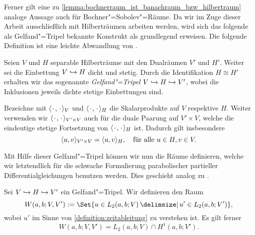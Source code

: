 \documentclass[../main.tex]{subfiles}
\begin{document}
Ferner gilt eine zu \cref{lemma:bochnerraum_ist_banachraum_bzw_hilbertraum} analoge Aussage auch für Bochner"=Sobolev"=Räume.
Da wir im Zuge dieser Arbeit ausschließlich mit Hilberträumen arbeiten werden, wird sich das folgende als Gelfand"=Tripel bekannte Konstrukt als grundlegend erweisen.
Die folgende Definition ist eine leichte Abwandlung von \cite[Abschnitt 10.2]{Schweizer2013}.

\begin{Definition}
\label{definition:gelfand_tripel}
    Seien $V$ und $H$ separable Hilberträume mit den Dualräumen $V'$ und $H'$.
    Weiter sei die Einbettung $V \denseinclusion H$ dicht und stetig.
    Durch die Identifikation $H \cong H'$ erhalten wir das sogenannte \emph{Gelfand"=Tripel} $V \denseinclusion H \denseinclusion V'$, wobei die Inklusionen jeweils dichte stetige Einbettungen sind.
\end{Definition}

\begin{Bemerkung}
\label{bemerkung:skalarprodukte_und_duality_pairing}
    Bezeichne mit $\skp{\blank}{\blank}{V}$ und $\skp{\blank}{\blank}{H}$ die Skalarprodukte auf $V$ respektive $H$.
    Weiter verwenden wir $\skp{\blank}{\blank}{V' \times V}$ auch für die duale Paarung auf $V' \times V$, welche die eindeutige stetige Fortsetzung von $\skp{\blank}{\blank}{H}$ ist.
    Dadurch gilt insbesondere
    \begin{equation}
        \skp{u}{v}{V' \times V} = \skp{u}{v}{H}, \quad \fa u \in H, v \in V.
    \end{equation}
\end{Bemerkung}

Mit Hilfe dieser Gelfand"=Tripel können wir nun die Räume definieren, welche wir letztendlich für die schwache Formulierung parabolischer partieller Differentialgleichungen benutzen werden.
Dies geschieht analog zu \cite[Definition XVIII.2.4]{Dautray:1992by}.

\begin{Definition}
\label{definition:bochner_raum_W}
    Sei $V \denseinclusion H \denseinclusion V'$ ein Gelfand"=Tripel.
    Wir definieren den Raum
    \begin{equation}
        W(a, b; V, V') := \Set{u \in L_{2}(a, b; V) \given u' \in L_{2}(a, b; V')},
    \end{equation}
    wobei $u'$ im Sinne von \cref{definition:zeitableitung} zu verstehen ist.
    Es gilt ferner
    \begin{equation}
        W(a, b; V, V') = L_{2}(a, b; V) \cap H^{1}(a, b; V').
    \end{equation}
\end{Definition}
\end{document}
